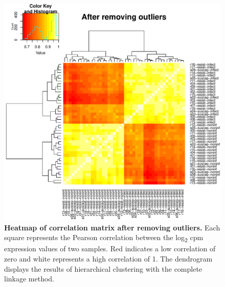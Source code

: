 \begin{figure}[ht]
\centering
\includegraphics[width=5in]{img/ch03/heatmap-no-outliers.pdf}
\caption[Heatmap of correlation matrix after removing outliers.]{
\textbf{Heatmap of correlation matrix after removing outliers.} Each square
represents the Pearson correlation between the log\textsubscript{2}
cpm expression values of two samples. Red indicates a low correlation
of zero and white represents a high correlation of 1. The dendrogram
displays the results of hierarchical clustering with the complete
linkage method.
}
\label{fig:heat-filt}
\end{figure}


